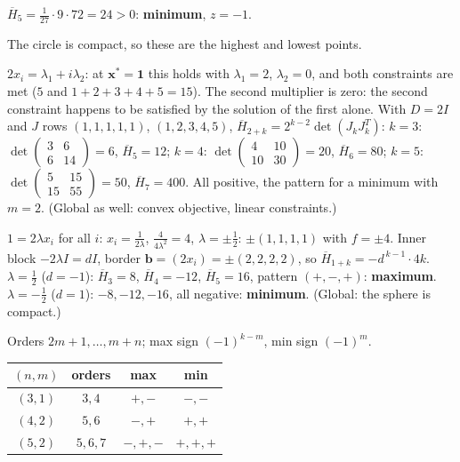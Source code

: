 \begin{solutions}
\begin{itemize}
                $\overline{H}_5=\tfrac1{27}\cdot9\cdot72=24>0$: \textbf{minimum},
                $z=-1$.
        \end{itemize}
        The circle is compact, so these are the highest and lowest points.
  \item $2x_i=\lambda_1+i\lambda_2$: at $\mathbf{x}^*=\mathbf{1}$ this holds
        with $\lambda_1=2$, $\lambda_2=0$, and both constraints are met
        ($5$ and $1+2+3+4+5=15$). The second multiplier is zero: the second
        constraint happens to be satisfied by the solution of the first
        alone. With $D=2I$ and $J$ rows $(1,1,1,1,1)$, $(1,2,3,4,5)$,
        $\overline{H}_{2+k}=2^{k-2}\det(J_kJ_k^{T})$:
        $k=3$: $\det\begin{pmatrix}3&6\\6&14\end{pmatrix}=6$, $\overline{H}_5=12$;
        $k=4$: $\det\begin{pmatrix}4&10\\10&30\end{pmatrix}=20$, $\overline{H}_6=80$;
        $k=5$: $\det\begin{pmatrix}5&15\\15&55\end{pmatrix}=50$, $\overline{H}_7=400$.
        All positive, the pattern for a minimum with $m=2$. (Global as
        well: convex objective, linear constraints.)
  \item $1=2\lambda x_i$ for all $i$: $x_i=\tfrac{1}{2\lambda}$,
        $\tfrac{4}{4\lambda^{2}}=4$, $\lambda=\pm\tfrac12$: $\pm(1,1,1,1)$ with
        $f=\pm4$. Inner block $-2\lambda I=dI$, border
        $\mathbf{b}=(2x_i)=\pm(2,2,2,2)$, so
        $\overline{H}_{1+k}=-d^{\,k-1}\cdot4k$.
        $\lambda=\tfrac12$ ($d=-1$): $\overline{H}_3=8$,
        $\overline{H}_4=-12$, $\overline{H}_5=16$, pattern $(+,-,+)$:
        \textbf{maximum}. $\lambda=-\tfrac12$ ($d=1$): $-8,-12,-16$, all
        negative: \textbf{minimum}. (Global: the sphere is compact.)
  \item Orders $2m+1,\dots,m+n$; max sign $(-1)^{k-m}$, min sign $(-1)^{m}$.
        \begin{center}\footnotesize
        \begin{tabular}{cccc}
          \hline
          $(n,m)$ & orders & max & min\\
          \hline
          $(3,1)$ & $3,4$ & $+,-$ & $-,-$\\
          $(4,2)$ & $5,6$ & $-,+$ & $+,+$\\
          $(5,2)$ & $5,6,7$ & $-,+,-$ & $+,+,+$\\

\end{tabular}
\end{center}
\end{solutions}
